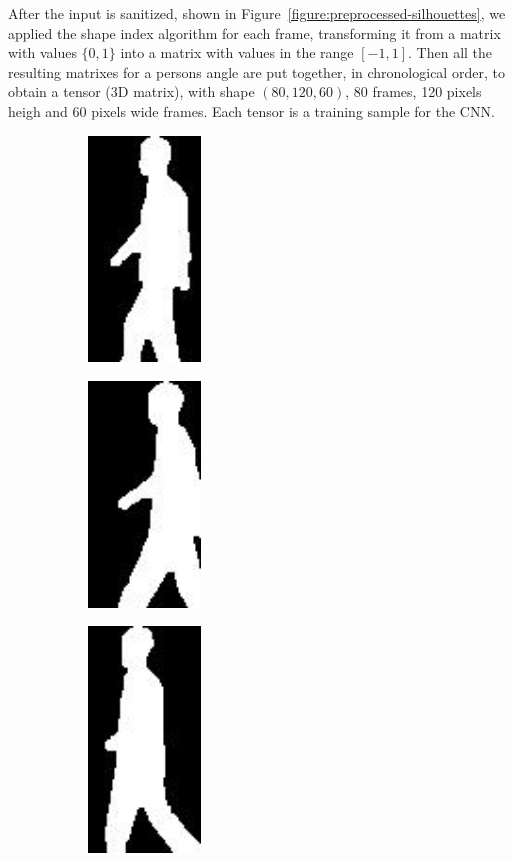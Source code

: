 \documentclass[12pt]{article}
\theoremstyle{definition}
\begin{document}
	After the input is sanitized, shown in Figure~\ref{figure:preprocessed-silhouettes}, we applied the shape index algorithm for each frame, transforming it from a matrix with values $\{0, 1\}$ into a matrix with values in the range $[-1, 1]$. Then all the resulting matrixes for a persons angle are put together, in chronological order, to obtain a tensor (3D matrix), with shape $(80, 120, 60)$, 80 frames, 120 pixels heigh and 60 pixels wide frames. Each tensor is a training sample for the CNN.

	\begin{figure}[h]
		\centering

		\begin{subfigure}{3cm}
			\centering\includegraphics[width=3cm]{processed-slihouettes/90-1.jpg}
			\caption{}
		\end{subfigure}
		\hspace{0.5cm}
		\begin{subfigure}{3cm}
			\centering\includegraphics[width=3cm]{processed-slihouettes/90-2.jpg}
			\caption{}
		\end{subfigure}
		\hspace{0.5cm}
		\begin{subfigure}{3cm}
			\centering\includegraphics[width=3cm]{processed-slihouettes/90-3.jpg}

\end{subfigure}
\end{figure}
\end{document}

